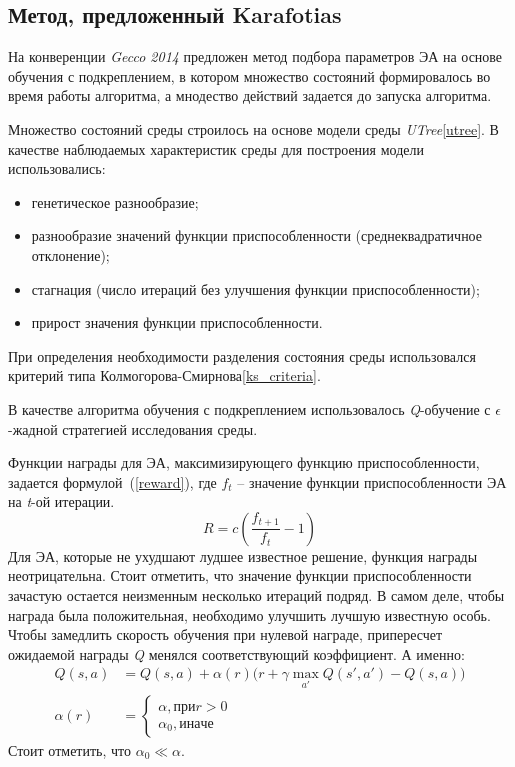 \subsection{Метод, предложенный Karafotias}
\label{karafotias}

На конверенции \textit{Gecco 2014} предложен метод подбора параметров ЭА на основе обучения с подкреплением, в котором множество состояний формировалось во время работы алгоритма, а мнодество действий задается до запуска алгоритма.

Множество состояний среды строилось на основе модели среды \textit{UTree}\ref{utree}. В качестве наблюдаемых характеристик среды для построения модели использовались:

\begin{itemize}
    \item генетическое разнообразие;
    \item разнообразие значений функции приспособленности (среднеквадратичное отклонение);
    \item стагнация (число итераций без улучшения функции приспособленности);
    \item прирост значения функции приспособленности.
\end{itemize}

При определения необходимости разделения состояния среды использовался критерий типа Колмогорова-Смирнова\ref{ks_criteria}.

В качестве алгоритма обучения с подкреплением использовалось \textit{Q}-обучение с $\epsilon$-жадной стратегией исследования среды.

Функции награды для ЭА, максимизирующего функцию приспособленности, задается формулой~(\ref{reward}), где $f_t$ -- значение функции приспособленности ЭА на \textit{t}-ой итерации.
\begin{equation}
\label{reward}
R = c(\frac{f_{t+1}}{f_t} - 1)
\end{equation}
 Для ЭА, которые не ухудшают лудшее известное решение, функция награды неотрицательна. Стоит отметить, что значение функции приспособленности зачастую остается неизменным несколько итераций подряд. В самом деле, чтобы награда была положительная, необходимо улучшить лучшую известную особь. Чтобы замедлить скорость обучения при нулевой награде, припересчет ожидаемой награды \textit{Q} менялся соответствующий коэффициент. А именно:
\begin{align*}
Q(s,a) &= Q(s,a) + \alpha(r)(r + \gamma \max_{a'}{Q(s',a') - Q(s, a))} \\
\alpha(r) &= \begin{cases}\alpha, при r > 0 \\ \alpha_0, иначе \end{cases}
\end{align*}
Стоит отметить, что $\alpha_0 \ll \alpha$.

